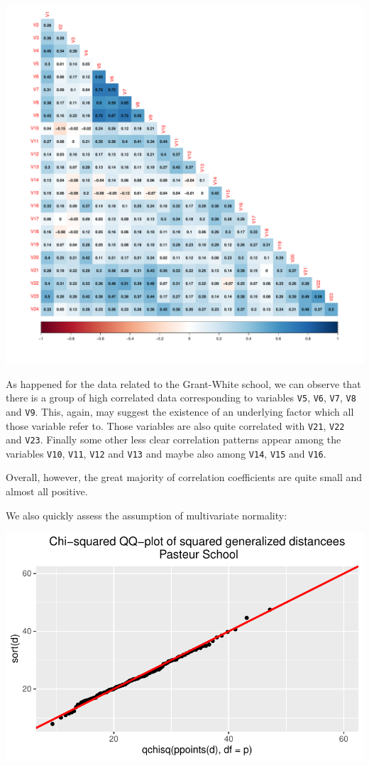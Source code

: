 \documentclass[
  letterpaper,
  DIV=11,
  numbers=noendperiod]{scrartcl}
\begin{document}
\includegraphics{ProblemSet2_files/figure-pdf/unnamed-chunk-41-1.pdf}

As happened for the data related to the Grant-White school, we can
observe that there is a group of high correlated data corresponding to
variables \texttt{V5}, \texttt{V6}, \texttt{V7}, \texttt{V8} and
\texttt{V9}. This, again, may suggest the existence of an underlying
factor which all those variable refer to. Those variables are also quite
correlated with \texttt{V21}, \texttt{V22} and \texttt{V23}. Finally
some other less clear correlation patterns appear among the variables
\texttt{V10}, \texttt{V11}, \texttt{V12} and \texttt{V13} and maybe also
among \texttt{V14}, \texttt{V15} and \texttt{V16}.

Overall, however, the great majority of correlation coefficients are
quite small and almost all positive.

We also quickly assess the assumption of multivariate normality:

\includegraphics{ProblemSet2_files/figure-pdf/unnamed-chunk-42-1.pdf}
\end{document}
